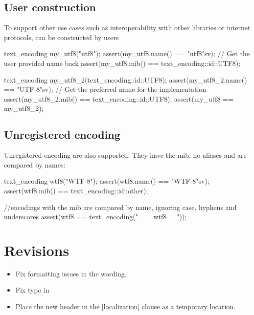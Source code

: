 \documentclass{wg21}
\begin{document}
\subsection{User construction}

To support other use cases such as interoperability with other libraries or internet protocols,
 can be constructed by users

\begin{colorblock}
text_encoding my_utf8("utf8");
assert(my_utf8.name() == "utf8"sv); // Get the user provided name back
assert(my_utf8.mib() == text_encoding::id::UTF8);

text_encoding my_utf8_2(text_encoding::id::UTF8);
assert(my_utf8_2.name() == "UTF-8"sv); // Get the preferred name for the implementation
assert(my_utf8_2.mib() == text_encoding::id::UTF8);
assert(my_utf8 == my_utf8_2);
\end{colorblock}

\subsection{Unregistered encoding}

Unregistered encoding are also supported. They have the  mib, no aliases and are compared
by names:

\begin{colorblock}
text_encoding wtf8("WTF-8");
assert(wtf8.name() == "WTF-8"sv);
assert(wtf8.mib() == text_encoding::id::other);

//encodings with the  mib are compared by name, ignoring case, hyphens and underscores
assert(wtf8 == text_encoding("___wtf8__"));
\end{colorblock}


\section{Revisions}


\begin{itemize}
    \item Fix formatting issues in the wording.
    \item Fix typo in 
    \item Place the new header in the [localization] clause as a temporary location.
\end{itemize}
\end{document}
